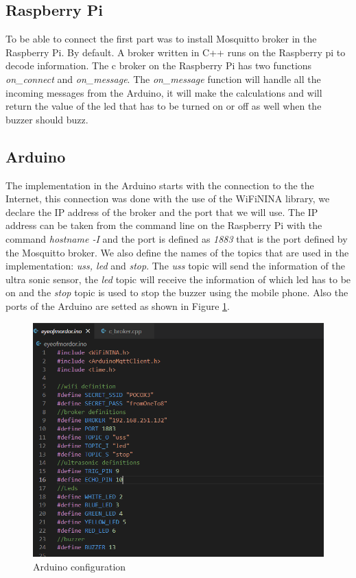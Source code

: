 \documentclass[12pt]{article}
\begin{document}
\subsection{Raspberry Pi}

To be able to connect the first part was to install Mosquitto broker in the Raspberry Pi. By default. A broker written in C++ runs on the Raspberry pi to decode information. The c broker on the Raspberry Pi has two functions \textit{on\_connect} and \textit{on\_message}. The \textit{on\_message} function will handle all the incoming messages from the Arduino, it will make the calculations and will return the value of the led that has to be turned on or off as well when the buzzer should buzz.

\subsection{Arduino} \label{sec:arduino}

The implementation in the Arduino starts with the connection to the the Internet, this connection was done with the use of the WiFiNINA library, we declare the IP address of the broker and the port that we will use. The IP address can be taken from the command line on the Raspberry Pi with the command \textit{hostname -I} and the port is defined as \textit{1883} that is the port defined by the Mosquitto broker. We also define the names of the topics that are used in the implementation: \textit{uss, led} and \textit{stop}. The \textit{uss} topic will send the information of the ultra sonic sensor, the \textit{led} topic will receive the information of which led has to be on and the \textit{stop} topic is used to stop the buzzer using the mobile phone. Also the ports of the Arduino are setted as shown in Figure \ref{fig:arduino1}.

\begin{figure}[h]
\includegraphics[scale=0.665]{img/ard1.png}
\caption{Arduino configuration}
\label{fig:arduino1}
\end{figure}
\end{document}
